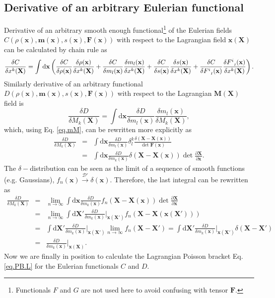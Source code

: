 \documentclass[
10pt, %
a4paper, %
oneside, %
headinclude,footinclude, %
BCOR5mm, %
]{scrartcl}
\newcommand{\xx}{\mathbf{x}}
\newcommand{\XX}{\mathbf{X}}
\newcommand{\dX}{\mathrm{d}\XX}
\newcommand{\dx}{\mathrm{d}\xx}
\newcommand{\mm}{\mathbf{m}}
\newcommand{\MM}{\mathbf{M}}
\newcommand{\FF}{\mathbf{F}}
\newcommand{\F}[2]{F^{#1}_{\ \, \mathsmaller#2}}
\begin{document}
\subsection{Derivative of an arbitrary Eulerian functional}
Derivative of an arbitrary smooth enough functional\footnote{Functionals $F$ and $G$ are not used here to avoid confusing with tensor $\FF$.} of the Eulerian fields $C(\rho(\xx), \mm(\xx), s(\xx), \FF(\xx))$ with respect to the Lagrangian field $\xx(\XX)$ can be calculated by chain rule as
\begin{equation}\label{eq.Cx}
	\frac{\delta C}{\delta x^k(\XX)} = \int\dx \left(\frac{\delta C}{\delta \rho(\xx)}\frac{\delta \rho(\xx)}{\delta x^k(\XX)}
	+\frac{\delta C}{\delta m_l(\xx)}\frac{\delta m_l(\xx)}{\delta x^k(\XX)}
	+\frac{\delta C}{\delta s(\xx)}\frac{\delta s(\xx)}{\delta x^k(\XX)}
	+\frac{\delta C}{\delta \F{i}{I}(\xx)}\frac{\delta \F{i}{I}(\xx)}{\delta x^k(\XX)}\right).
\end{equation}
Similarly derivative of an arbitrary functional $D(\rho(\xx), \mm(\xx), s(\xx), \FF(\xx))$ with respect to the Lagrangian $\MM(\XX)$ field is
\begin{equation}
	\frac{\delta D}{\delta M_k(\XX)} = \int\dx \frac{\delta D}{\delta m_l(\xx)}\frac{\delta m_l(\xx)}{\delta M_k(\XX)},
\end{equation}
which, using Eq. \eqref{eq.mM}, can be rewritten more explicitly as
\begin{eqnarray}
	\frac{\delta D}{\delta M_k(\XX)} &=& \int\dx \frac{\delta D}{\delta m_l(\xx)}\delta^k_l \frac{\delta(\XX-\XX(\xx))}{\det\FF(\xx)}\nonumber\\
	&=& \int\dx \frac{\delta D}{\delta m_k(\xx)}\delta(\XX-\XX(\xx))\det\frac{\partial \XX}{\partial \xx}.
\end{eqnarray}
The $\delta-$distribution can be seen as the limit of a sequence of smooth functions (e.g. Gaussians), $f_n(\xx)\stackrel{\mathcal{D}'}{\to}\delta(\xx)$. Therefore, the last integral can be rewritten as
\begin{eqnarray}
	\frac{\delta D}{\delta M_k(\XX)} &=& \lim_{n\to\infty}\int\dx \frac{\delta D}{\delta m_k(\xx)}f_n(\XX-\XX(\xx)) \det\frac{\partial \XX}{\partial \xx}\nonumber\\
	&=& \lim_{n\to\infty}\int\dX' \frac{\delta D}{\delta m_k(\xx)}\Big|_{\xx(\XX')} f_n(\XX-\XX(\xx(\XX'))) \nonumber\\
	&=& \int\dX' \frac{\delta D}{\delta m_k(\xx)}\Big|_{\xx(\XX')} \lim_{n\to\infty}f_n(\XX-\XX') 
	= \int\dX' \frac{\delta D}{\delta m_k(\xx)}\Big|_{\xx(\XX')} \delta(\XX-\XX') \nonumber\\
	&=&\frac{\delta D}{\delta m_k(\xx)}\Big|_{\xx(\XX)}.
\end{eqnarray}
Now we are finally in position to calculate the Lagrangian Poisson bracket Eq. \eqref{eq.PB.L} for the Eulerian functionals $C$ and $D$. 
\end{document}

